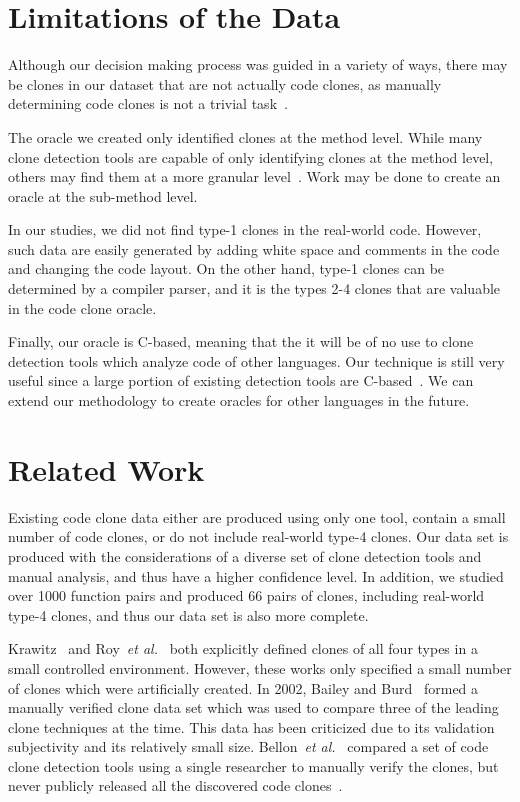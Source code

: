\documentclass{sig-alternate}
\begin{document}
\section{Limitations of the Data}

Although our decision making process was guided in a variety of ways, there may be clones in our dataset that are not actually code clones, as manually determining code clones is not a trivial task~\cite{Walenstein:2003:PCT:950792.951349}.

The oracle we created only identified clones at the method level. While many clone detection tools are capable of only identifying clones at the method level, others may find them at a more granular level~\cite{Roy:2009:CEC:1530898.1531101}. Work may be done to create an oracle at the sub-method level.

In our studies, we did not find type-1 clones in the real-world code. However, such data are easily generated by adding white space and comments in the code and changing the code layout. On the other hand, type-1 clones can be determined by a compiler parser, and it is the types 2-4 clones that are valuable in the code clone oracle.

Finally, our oracle is C-based, meaning that the it will be of no use to clone detection tools which analyze code of other languages. Our technique is still very useful since a large portion of existing detection tools are C-based~\cite{Roy:2009:CEC:1530898.1531101}. We can extend our methodology to create oracles for other languages in the future.


\section{Related Work}
\label{sec: relatedworks}

Existing code clone data either are produced using only one tool, contain a small number of code clones, or do not include real-world type-4 clones. Our data set is produced with the considerations of a diverse set of clone detection tools and manual analysis, and thus have a higher confidence level. In addition, we studied over 1000 function pairs and produced 66 pairs of clones, including real-world type-4 clones, and thus our data set is also more complete.

Krawitz~\cite{Kraw2012} and Roy~\emph{et al.}~\cite{Roy:2009:CEC:1530898.1531101} both explicitly defined clones of all four types in a small controlled environment. However, these works only specified a small number of clones which were artificially created. In 2002, Bailey and Burd~\cite{Burd:2002:ECD:827253.827745} formed a manually verified clone data set which was used to compare three of the leading clone techniques at the time. This data has been criticized due to its validation subjectivity and its relatively small size. Bellon~\emph{et al.}~\cite{4288192} compared a set of code clone detection tools using a single researcher to manually verify the clones, but never publicly released all the discovered code clones~\cite{Roy:2009:CEC:1530898.1531101}.
\end{document}
